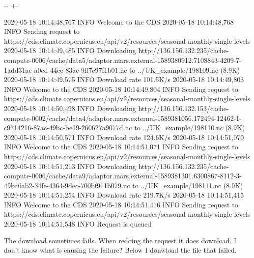 \documentclass[letterpaper,10pt,english]{sphinxmanual}
\newlength\nbsphinxcodecellspacing
\begin{document}
{

\kern-\sphinxverbatimsmallskipamount\kern-\baselineskip
\kern+\FrameHeightAdjust\kern-\fboxrule
\vspace{\nbsphinxcodecellspacing}

\begin{sphinxVerbatim}[commandchars=\\\{\}]
2020-05-18 10:14:48,767 INFO Welcome to the CDS
2020-05-18 10:14:48,768 INFO Sending request to https://cds.climate.copernicus.eu/api/v2/resources/seasonal-monthly-single-levels
2020-05-18 10:14:49,485 INFO Downloading http://136.156.132.235/cache-compute-0006/cache/data5/adaptor.mars.external-1589380912.7108843-4209-7-1add31ae-a0cd-44ce-83ac-9ff7c97f1b01.nc to ../UK\_example/198109.nc (8.9K)
2020-05-18 10:14:49,575 INFO Download rate 101.5K/s
2020-05-18 10:14:49,803 INFO Welcome to the CDS
2020-05-18 10:14:49,804 INFO Sending request to https://cds.climate.copernicus.eu/api/v2/resources/seasonal-monthly-single-levels
2020-05-18 10:14:50,498 INFO Downloading http://136.156.132.153/cache-compute-0002/cache/data4/adaptor.mars.external-1589381056.172494-12462-1-c9714216-87ac-49bc-be19-260627a9077d.nc to ../UK\_example/198110.nc (8.9K)
2020-05-18 10:14:50,571 INFO Download rate 124.6K/s
2020-05-18 10:14:51,070 INFO Welcome to the CDS
2020-05-18 10:14:51,071 INFO Sending request to https://cds.climate.copernicus.eu/api/v2/resources/seasonal-monthly-single-levels
2020-05-18 10:14:51,213 INFO Downloading http://136.156.132.235/cache-compute-0006/cache/data9/adaptor.mars.external-1589381301.6300867-8112-3-49ba0ab2-34fe-4364-9dec-700bf911b079.nc to ../UK\_example/198111.nc (8.9K)
2020-05-18 10:14:51,254 INFO Download rate 219.7K/s
2020-05-18 10:14:51,415 INFO Welcome to the CDS
2020-05-18 10:14:51,416 INFO Sending request to https://cds.climate.copernicus.eu/api/v2/resources/seasonal-monthly-single-levels
2020-05-18 10:14:51,548 INFO Request is queued
\end{sphinxVerbatim}
}

The download sometimes fails. When redoing the request it does download. I don’t know what is causing the failure? Below I donwload the file that failed.
\end{document}
